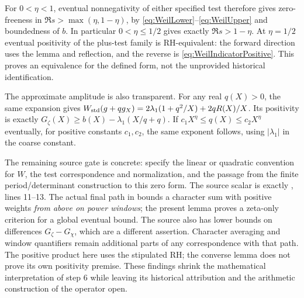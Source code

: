 For $0<\eta<1$, eventual nonnegativity of either specified test therefore gives zero-freeness in $\Re s>\max(\eta,1-\eta)$, by \eqref{eq:WeilLower}--\eqref{eq:WeilUpper} and boundedness of $b$. In particular $0<\eta\le1/2$ gives exactly $\Re s>1-\eta$. At $\eta=1/2$ eventual positivity of the plus-test family is RH-equivalent: the forward direction uses the lemma and reflection, and the reverse is \eqref{eq:WeilIndicatorPositive}. This proves an equivalence for the defined form, not the unprovided historical identification.

The approximate amplitude is also transparent. For any real $q(X)>0$, the same expansion gives
$W_{\rm std}(g+qg_X)=2\lambda_1(1+q^2/X)+2qR(X)/X$.
Its positivity is exactly $G_\zeta(X)\ge b(X)-\lambda_1(X/q+q)$.
If $c_1X^\eta\le q(X)\le c_2X^\eta$ eventually, for positive constants $c_1,c_2$, the same exponent follows, using $|\lambda_1|$ in the coarse constant.

The remaining source gate is concrete: specify the linear or quadratic convention for $W$, the test correspondence and normalization, and the passage from the finite period/determinant construction to this zero form. The source scalar is exactly , lines 11--13. The actual final path in  bounds a character sum with positive weights \emph{from above on power windows}; the present lemma proves a zeta-only criterion for a global eventual bound. The source also has lower bounds on differences $G_\zeta-G_\chi$, which are a different assertion. Character averaging and window quantifiers remain additional parts of any correspondence with that path. The positive product here uses the stipulated RH; the converse lemma does not prove its own positivity premise. These findings shrink the mathematical interpretation of step 6 while leaving its historical attribution and the arithmetic construction of the operator open.
